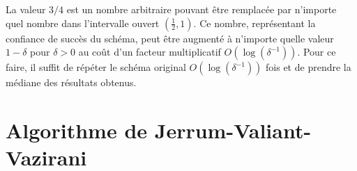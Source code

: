 La valeur $3/4$ est un nombre arbitraire pouvant être remplacée par n'importe quel nombre dans l'intervalle ouvert $(\frac{1}{2}, 1)$. Ce nombre, représentant la confiance de succès du schéma, peut être augmenté à n'importe quelle valeur $1-\delta$ pour $\delta > 0$ au coût d'un facteur multiplicatif $O(\log(\delta^{-1}))$. Pour ce faire, il suffit de répéter le schéma original $O(\log(\delta^{-1}))$ fois et de prendre la médiane des résultats obtenus.   


\section{Algorithme de Jerrum-Valiant-Vazirani}
\label{sec:algorithme-jvv}

